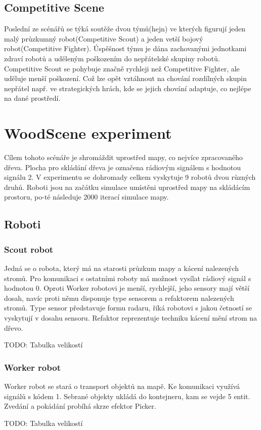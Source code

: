 \subsection{Competitive Scene}
Poslední ze scénářů se týká soutěže dvou týmů(hejn) ve kterých figurují jeden malý průzkumný robot(Competitive Scout) a jeden vetší bojový robot(Competitive Fighter). Úspěšnost týmu je dána zachovanými jednotkami zdraví robotů a uděleným poškozením do nepřátelské skupiny robotů. Competitive Scout se pohybuje značně rychleji než Competitive Fighter, ale uděluje menší poškození. Což lze opět vztáhnout na chování rozdílných skupin nepřátel např. ve strategických hrách, kde se jejich chování adaptuje, co nejlépe na dané prostředí. 

\section{WoodScene experiment}
Cílem tohoto scénáře je shromáždit uprostřed mapy, co nejvíce zpracovaného dřeva. Plocha pro skládání dřeva je označena rádiovým signálem s hodnotou signálu 2. V experimentu se dohromady celkem vyskytuje 9 robotů dvou různých druhů. Roboti jsou na začátku simulace umístěni uprostřed mapy na skládácím prostoru, po-té následuje 2000 iterací simulace mapy. 

\subsection{Roboti}

\subsubsection{Scout robot}
Jedná se o robota, který má na starosti průzkum mapy a kácení nalezených stromů. Pro komunikaci s ostatními roboty má možnost vysílat rádiový signál s hodnotou 0. Oproti Worker robotovi je menší, rychlejší, jeho sensory mají větší dosah, navíc proti němu disponuje type sensorem a refaktorem nalezených stromů. Type sensor představuje formu radaru, říká robotovi s jakou četností se vyskytují v dosahu sensoru. Refaktor reprezentuje techniku kácení mění strom na dřevo. 
\par 
TODO: Tabulka velikostí

\subsubsection{Worker robot}
Worker robot se stará o transport objektů na mapě. Ke komunikaci využívá signálů s kódem 1. Sebrané objekty ukládá do kontejneru, kam se vejde 5 entit. Zvedání a pokádání probíhá skrze efektor Picker. 
\par 
TODO: Tabulka velikostí

